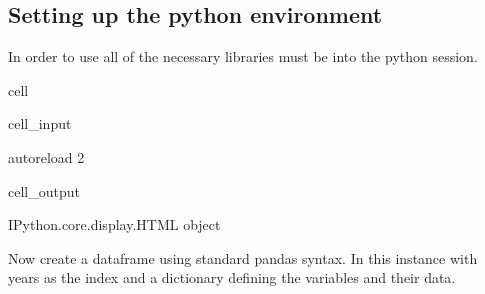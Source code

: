 \documentclass[letterpaper,10pt,english]{jupyterBook}
\begin{document}
\subsection{Setting up the python environment}
\label{\detokenize{content/04_PythonEssentials/UpdateCommand:setting-up-the-python-environment}}
\sphinxAtStartPar
In order to use  all of the necessary libraries must be  into the python session.

\begin{sphinxuseclass}{cell}\begin{sphinxVerbatimInput}

\begin{sphinxuseclass}{cell_input}
\begin{sphinxVerbatim}[commandchars=\\\{\}]
 autoreload
 2

   

    
\end{sphinxVerbatim}

\end{sphinxuseclass}\end{sphinxVerbatimInput}
\begin{sphinxVerbatimOutput}

\begin{sphinxuseclass}{cell_output}
\begin{sphinxVerbatim}[commandchars=\\\{\}]
\PYGZlt{}IPython.core.display.HTML object\PYGZgt{}
\end{sphinxVerbatim}

\end{sphinxuseclass}\end{sphinxVerbatimOutput}

\end{sphinxuseclass}
\sphinxAtStartPar
Now create a dataframe using standard pandas syntax.  In this instance with years as the index and a dictionary defining the variables and their data.
\end{document}
